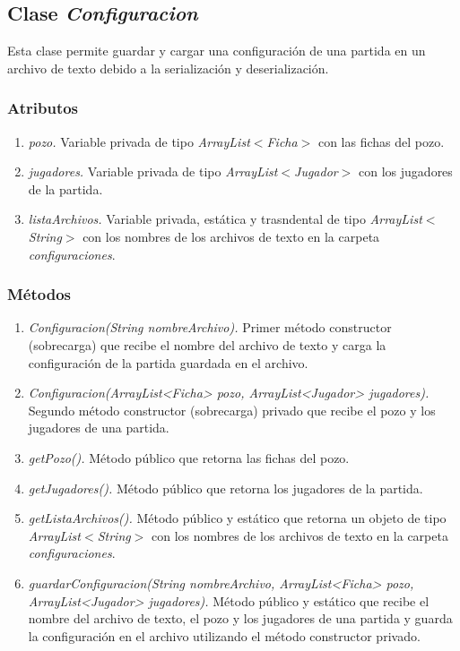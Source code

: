 \documentclass[12pt]{article}
\begin{document}
  \subsection{Clase \textit{Configuracion}}
  Esta clase permite guardar y cargar una configuración de una partida en un archivo de texto debido a la serialización y deserialización.

  \subsubsection{Atributos}
  \begin{enumerate}
    \item \textit{pozo.} Variable privada de tipo \textit{ArrayList$<$Ficha$>$} con las fichas del pozo.
    \item \textit{jugadores.} Variable privada de tipo \textit{ArrayList$<$Jugador$>$} con los jugadores de la partida.
    \item \textit{listaArchivos.} Variable privada, estática y trasndental de tipo \textit{ArrayList$<$String$>$} con los nombres de los archivos de texto en la carpeta \textit{configuraciones}.
  \end{enumerate}

  \subsubsection{Métodos}
  \begin{enumerate}
    \item \textit{Configuracion(String nombreArchivo).} Primer método constructor (sobrecarga) que recibe el nombre del archivo de texto y carga la configuración de la partida guardada en el archivo.
    \item \textit{Configuracion(ArrayList<Ficha> pozo, ArrayList<Jugador> jugadores).} Segundo método constructor (sobrecarga) privado que recibe el pozo y los jugadores de una partida.
    \item \textit{getPozo().} Método público que retorna las fichas del pozo.
    \item \textit{getJugadores().} Método público que retorna los jugadores de la partida.
    \item \textit{getListaArchivos().} Método público y estático que retorna un objeto de tipo \textit{ArrayList$<$String$>$} con los nombres de los archivos de texto en la carpeta \textit{configuraciones}.
    \item \textit{guardarConfiguracion(String nombreArchivo, ArrayList<Ficha> pozo, ArrayList<Jugador> jugadores).} Método público y estático que recibe el nombre del archivo de texto, el pozo y los jugadores de una partida y guarda la configuración en el archivo utilizando el método constructor privado.
  \end{enumerate}
\end{document}
